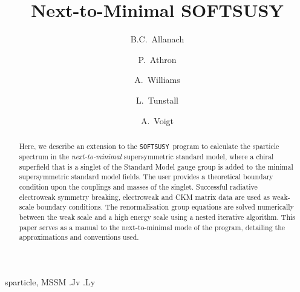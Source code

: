 \documentclass[final,3p,times,pdflatex]{elsarticle}
\begin{document}
\begin{frontmatter}

\title{Next-to-Minimal SOFTSUSY}

\author{B.C.~Allanach}
\address{DAMTP, CMS, University of Cambridge, Wilberforce road, Cambridge, CB3
  0WA, United Kingdom}

\author{P.~Athron}
\author{A.~Williams}
\author{L.~Tunstall}
\address{Department of Physics, North Terrace, University of Adelaide,
  Adelaide SA 5005, Australia}

\author{A.~Voigt}
\address{Dipl.-Phys. Alexander Voigt,
Institut für Kern- und Teilchenphysik,
Helmholtzstraße 10, 
D-01069 Dresden,
Germany}
\begin{abstract}
  Here, we describe an extension to the
  {\tt SOFTSUSY}~program to calculate the sparticle spectrum in the
  {\em next-to-minimal} supersymmetric standard model, where a chiral
  superfield that is a singlet of the Standard Model gauge group is added to
  the minimal supersymmetric standard model fields. 
  The user provides a theoretical boundary condition upon the couplings and
  masses of the singlet.
  Successful radiative electroweak symmetry breaking,
  electroweak and CKM matrix data are used
  as weak-scale boundary conditions. 
  The renormalisation group equations are solved
  numerically between the weak scale and a high energy scale using a nested
  iterative algorithm. 
  This paper serves as a manual to the
  next-to-minimal mode of the program, detailing the approximations and
  conventions used. 
\end{abstract}

\begin{keyword}
sparticle, 
MSSM
.Jv
.Ly
\end{keyword}
\end{frontmatter}
\end{document}
